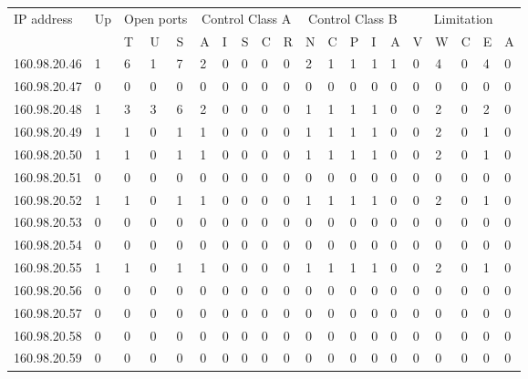 \documentclass[10pt,a4paper,twoside,onecolumn]{article}
\begin{document}
\begin{table}
\begin{threeparttable}[b]
\begin{tabularx}{\textwidth}{ l | l | X X X | X X X X X | X X X X X | X X X X X }
\toprule


\multirow{2}{*}{IP address} &
\multirow{2}{*}{Up} &
\multicolumn{3}{c|}{Open ports} &
\multicolumn{5}{c|}{Control Class A} &
\multicolumn{5}{c|}{Control Class B} &
\multicolumn{5}{c}{Limitation} \\
\cline{3-20}
& & T & U & S & A & I & S & C & R & N & C & P & I & A & V & W & C & E & A\\
\hline

160.98.20.46 & 1 & 6 & 1 & 7 & 2 & 0 & 0 & 0 & 0 & 2 & 1 & 1 & 1 & 1 & 0 & 4 & 0 & 4 & 0 \\
160.98.20.47 & 0 & 0 & 0 & 0 & 0 & 0 & 0 & 0 & 0 & 0 & 0 & 0 & 0 & 0 & 0 & 0 & 0 & 0 & 0 \\
160.98.20.48 & 1 & 3 & 3 & 6 & 2 & 0 & 0 & 0 & 0 & 1 & 1 & 1 & 1 & 0 & 0 & 2 & 0 & 2 & 0 \\
160.98.20.49 & 1 & 1 & 0 & 1 & 1 & 0 & 0 & 0 & 0 & 1 & 1 & 1 & 1 & 0 & 0 & 2 & 0 & 1 & 0 \\
160.98.20.50 & 1 & 1 & 0 & 1 & 1 & 0 & 0 & 0 & 0 & 1 & 1 & 1 & 1 & 0 & 0 & 2 & 0 & 1 & 0 \\
160.98.20.51 & 0 & 0 & 0 & 0 & 0 & 0 & 0 & 0 & 0 & 0 & 0 & 0 & 0 & 0 & 0 & 0 & 0 & 0 & 0 \\
160.98.20.52 & 1 & 1 & 0 & 1 & 1 & 0 & 0 & 0 & 0 & 1 & 1 & 1 & 1 & 0 & 0 & 2 & 0 & 1 & 0 \\
160.98.20.53 & 0 & 0 & 0 & 0 & 0 & 0 & 0 & 0 & 0 & 0 & 0 & 0 & 0 & 0 & 0 & 0 & 0 & 0 & 0 \\
160.98.20.54 & 0 & 0 & 0 & 0 & 0 & 0 & 0 & 0 & 0 & 0 & 0 & 0 & 0 & 0 & 0 & 0 & 0 & 0 & 0 \\
160.98.20.55 & 1 & 1 & 0 & 1 & 1 & 0 & 0 & 0 & 0 & 1 & 1 & 1 & 1 & 0 & 0 & 2 & 0 & 1 & 0 \\
160.98.20.56 & 0 & 0 & 0 & 0 & 0 & 0 & 0 & 0 & 0 & 0 & 0 & 0 & 0 & 0 & 0 & 0 & 0 & 0 & 0 \\
160.98.20.57 & 0 & 0 & 0 & 0 & 0 & 0 & 0 & 0 & 0 & 0 & 0 & 0 & 0 & 0 & 0 & 0 & 0 & 0 & 0 \\
160.98.20.58 & 0 & 0 & 0 & 0 & 0 & 0 & 0 & 0 & 0 & 0 & 0 & 0 & 0 & 0 & 0 & 0 & 0 & 0 & 0 \\
160.98.20.59 & 0 & 0 & 0 & 0 & 0 & 0 & 0 & 0 & 0 & 0 & 0 & 0 & 0 & 0 & 0 & 0 & 0 & 0 & 0 \\

\end{tabularx}
\end{threeparttable}
\end{table}
\end{document}
